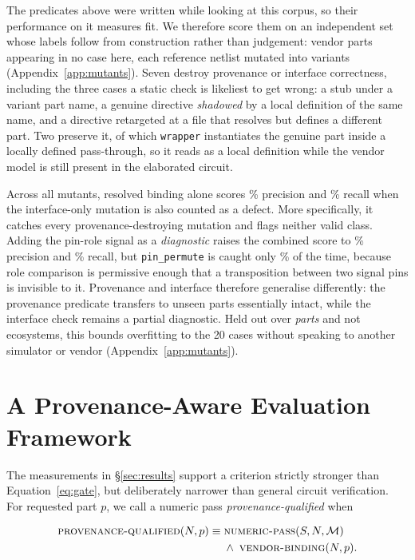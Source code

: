 The predicates above were written while looking at this corpus, so their
performance on it measures fit. We therefore score them on an independent set
whose labels follow from construction rather than judgement: \MutParts{}
vendor parts appearing in no case here, each reference netlist mutated into
\MutClasses{} variants (Appendix~\ref{app:mutants}). Seven destroy provenance
or interface correctness, including the three cases a static check is
likeliest to get wrong: a stub under a variant part name, a genuine directive
\emph{shadowed} by a local definition of the same name, and a directive
retargeted at a file that resolves but defines a different part. Two preserve
it, of which \texttt{wrapper} instantiates the genuine part inside a locally
defined pass-through, so it reads as a local definition while the vendor
model is still present in the elaborated circuit.

Across all \MutTotal{} mutants, resolved binding alone scores
\MutProvPrecision{}\% precision and \MutProvRecall{}\% recall when the
interface-only mutation is also counted as a defect. More specifically, it
catches every provenance-destroying mutation and flags neither valid class.
Adding the pin-role signal as a \emph{diagnostic} raises the combined score to
\MutPrecision{}\% precision and \MutRecall{}\% recall, but
\texttt{pin\_permute} is caught only \MutPinPermuteRate{}\% of the time,
because role comparison is permissive enough that a transposition between two
signal pins is invisible to it. Provenance and interface therefore generalise
differently: the provenance predicate transfers to unseen parts essentially
intact, while the interface check remains a partial diagnostic. Held out over
\emph{parts} and not ecosystems, this bounds overfitting to the 20 cases
without speaking to another simulator or vendor
(Appendix~\ref{app:mutants}).

\section{A Provenance-Aware Evaluation Framework}
\label{sec:protocol}

The measurements in \S\ref{sec:results} support a criterion strictly stronger
than Equation~\ref{eq:gate}, but deliberately narrower than general circuit
verification. For requested part $p$, we call a numeric pass
\emph{provenance-qualified} when

\begin{equation}
\label{eq:provqual}
\begin{aligned}
\textsc{provenance-qualified}(N,p) \equiv {}&
\textsc{numeric-pass}(S,N,\mathcal{M}) \\
&{}\wedge\;\textsc{vendor-binding}(N,p).
\end{aligned}
\end{equation}

